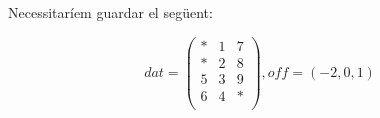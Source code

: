 \documentclass[11pt,a4paper,twoside]{report}
\begin{document}
    Necessitaríem guardar el següent:
     
      \[ dat = 
	 	\begin{pmatrix}
  		  	*	&	1	& 7	\\
  		  	*	&	2	&	8	\\
   		 	5	&	3	&	9	\\
    		6	&	4	&	*	\\
    \end{pmatrix} , off = (-2, 0, 1)    
     \] 
  
  
  
  



  
\end{document}
